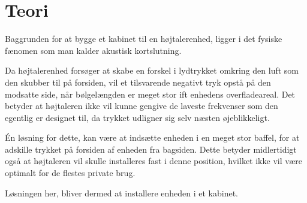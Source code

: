\chapter{Teori}

Baggrunden for at bygge et kabinet til en højtalerenhed, ligger i det fysiske fænomen som man kalder akustisk kortslutning. 

Da højtalerenhed forsøger at skabe en forskel i lydtrykket omkring den luft som den skubber til på forsiden, vil et tilsvarende negativt tryk opstå på den modsatte side, når bølgelængden er meget stor ift enhedens overfladeareal. Det betyder at højtaleren ikke vil kunne gengive de laveste frekvenser som den egentlig er designet til, da trykket udligner sig selv næsten øjeblikkeligt. 

Én løsning for dette, kan være at indsætte enheden i en meget stor baffel, for at adskille trykket på forsiden af enheden fra bagsiden. Dette betyder midlertidigt også at højtaleren vil skulle installeres fast i denne position, hvilket ikke vil være optimalt for de flestes private brug. 

Løsningen her, bliver dermed at installere enheden i et kabinet. 







